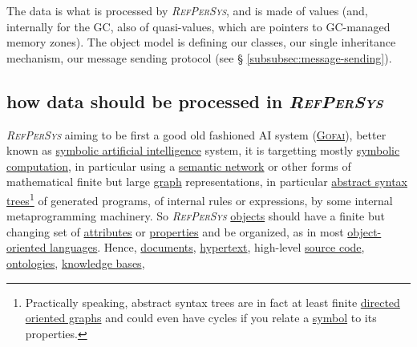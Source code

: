 \documentclass[11pt,a4paper,svgnames]{article}
\newcommand{\RefPerSys}{{\textit{\textsc{RefPerSys}}}}
\begin{document}
The data is what is processed by {\RefPerSys}, and is made of values
(and, internally for the GC, also of quasi-values, which are pointers
to GC-managed memory zones). The object model is defining our classes,
our single inheritance mechanism, our message sending protocol (see \S
\ref{subsubsec:message-sending}).

\subsection{how data should be processed in \RefPerSys}
\label{subsec:howdata}

{\RefPerSys} aiming to be first a good old fashioned AI system
(\href{http://bootstrappingartificialintelligence.fr/WordPress3/2013/12/the-future-of-ai-is-the-good-old-fashioned-artificial-intelligence/}{\textsc{Gofai}}),
better known as
\href{https://en.wikipedia.org/wiki/Symbolic\_artificial\_intelligence}{symbolic
  artificial intelligence} system, it is targetting mostly
\href{https://en.wikipedia.org/wiki/Computer\_algebra}{symbolic
  computation}, in particular using a
\href{https://en.wikipedia.org/wiki/Semantic\_network}{semantic
  network} or other forms of mathematical finite but large
\href{https://en.wikipedia.org/wiki/Graph\_(discrete\_mathematics)}{graph}
representations, in particular
\href{https://en.wikipedia.org/wiki/Abstract\_syntax\_tree}{abstract
  syntax trees}\footnote{Practically speaking, abstract syntax trees
are in fact at least finite
\href{https://en.wikipedia.org/wiki/Directed_acyclic_graph}{directed
  oriented graphs} and could even have cycles if you relate a
\href{https://en.wikipedia.org/wiki/Symbol\_(programming)}{symbol} to
its properties.} of generated programs, of internal rules or
expressions, by some internal metaprogramming machinery. So
{\RefPerSys}
\href{https://en.wikipedia.org/wiki/Object_(computer_science)}{objects}
should have a finite but changing set of
\href{https://en.wikipedia.org/wiki/Attribute_(computing)}{attributes}
or
\href{https://en.wikipedia.org/wiki/Property_(programming)}{properties}
and be organized, as in most
\href{https://en.wikipedia.org/wiki/Object-oriented_programming}{object-oriented
  languages}. Hence,
\href{https://en.wikipedia.org/wiki/Electronic\_document}{documents},
\href{https://en.wikipedia.org/wiki/Hypertext}{hypertext}, high-level
\href{https://en.wikipedia.org/wiki/Source\_code}{source code},
\href{https://en.wikipedia.org/wiki/Ontology\_(information\_science)}{ontologies},
\href{https://en.wikipedia.org/wiki/Knowledge\_base}{knowledge bases},
\end{document}
